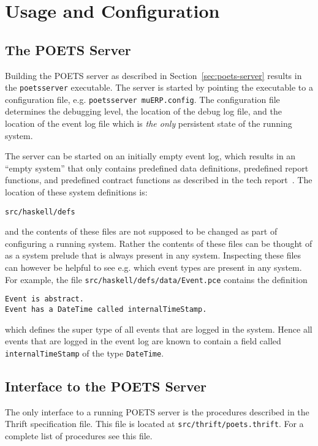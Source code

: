 \documentclass[10pt,final]{article}
\begin{document}
\section{Usage and Configuration}

\subsection{The POETS Server}\label{sec:usage-poets-server}
Building the POETS server as described in
Section~\ref{sec:poets-server} results in the \verb|poetsserver|
executable. The server is started by pointing the executable to a
configuration file, e.g. \verb|poetsserver muERP.config|. The
configuration file determines the debugging level, the location of the
debug log file, and the location of the event log file which is
\emph{the only} persistent state of the running system.

The server can be started on an initially empty event log, which
results in an ``empty system'' that only contains predefined data
definitions, predefined report functions, and predefined contract
functions as described in the tech report~\cite{hvitved11tr}. The
location of these system definitions is:
\begin{verbatim}
src/haskell/defs
\end{verbatim}
and the contents of these files are not supposed to be changed as part
of configuring a running system. Rather the contents of these files
can be thought of as a system prelude that is always present in any
system. Inspecting these files can however be helpful to see
e.g. which event types are present in any system. For example, the
file \verb|src/haskell/defs/data/Event.pce| contains the definition
\begin{verbatim}
Event is abstract.
Event has a DateTime called internalTimeStamp.
\end{verbatim}
which defines the super type of all events that are logged in the
system. Hence all events that are logged in the event log are known to
contain a field called \verb|internalTimeStamp| of the type
\verb|DateTime|.

\subsection{Interface to the POETS Server}
The only interface to a running POETS server is the procedures
described in the Thrift specification file. This file is located at
\verb|src/thrift/poets.thrift|. For a complete list of procedures see
this file.
\end{document}
